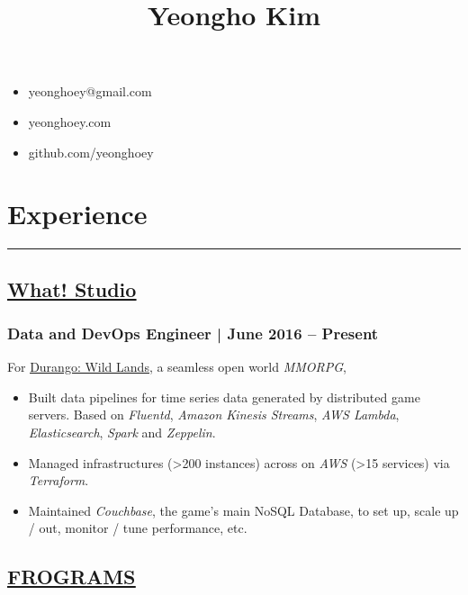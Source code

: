 \documentclass[11pt]{article}
\date{}
\title{Yeongho Kim}
\begin{document}
\maketitle
{}
\vspace{-20ex}

\begin{itemize}[itemindent=20.5em,label=\null,itemsep=-1ex]
\item yeonghoey@gmail.com
\item yeonghoey.com
\item github.com/yeonghoey
\end{itemize}


\section*{Experience}
\label{sec:org2543ac2}
\vspace{-4ex}

\noindent\rule{\textwidth}{0.5pt}
\vspace{-4ex}

\subsection*{\underline{\href{https://github.com/what-studio}{What! Studio}}}
\label{sec:orgc21e045}
\subsubsection*{Data and DevOps Engineer | June 2016 – Present}
\label{sec:org3c44617}
For \uline{\href{https://durango.nexon.com/en}{Durango: Wild Lands}}, a seamless open world \emph{MMORPG},

\begin{itemize}[label=$\circ$,itemsep=-0.5ex]
\item Built data pipelines for time series data generated by distributed game servers. Based on
\emph{Fluentd}, \emph{Amazon Kinesis Streams}, \emph{AWS Lambda}, \emph{Elasticsearch}, \emph{Spark} and \emph{Zeppelin}.
\item Managed infrastructures (>200 instances) across on \emph{AWS} (>15 services) via \emph{Terraform}.
\item Maintained \emph{Couchbase}, the game's main NoSQL Database, to set up, scale up / out,  monitor / tune performance, etc.
\end{itemize}

\subsection*{\underline{\href{http://frograms.com}{FROGRAMS}}}
\label{sec:orge41f01f}
\end{document}
